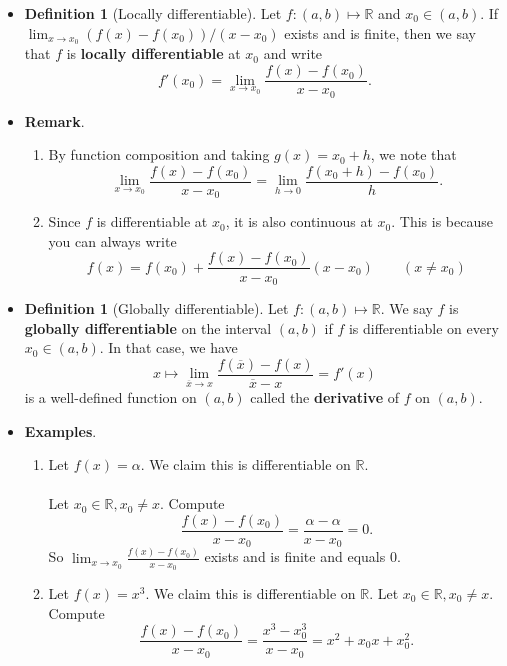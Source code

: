 \documentclass{article}
\newcommand{\R}{\mathbb{R}}
\newcommand{\?}{\stackrel{?}{=}}
\theoremstyle{definition} %
\newtheorem{definition}[theorem]{Definition} %
\begin{document}
\begin{itemize}
    \item[]
    \begin{definition}[Locally differentiable]
        Let $f: (a, b) \mapsto \R$ and $x_0 \in (a, b)$. If $\lim_{x \to x_0} (f(x) - f(x_0))/(x - x_0)$ exists and is finite, then we say that $f$ is \textbf{locally differentiable} at $x_0$ and write
        $$f'(x_0) = \lim_{x \to x_0} \frac{f(x) - f(x_0)}{x - x_0}.$$
    \end{definition}
    \item \textbf{Remark}.
    \begin{enumerate}[label=(\arabic*)]
        \item By function composition and taking $g(x) = x_0 + h$, we note that
        $$\lim_{x \to x_0} \frac{f(x) - f(x_0)}{x - x_0} = \lim_{h \to 0} \frac{f(x_0 + h) - f(x_0)}{h}.$$
        \item Since $f$ is differentiable at $x_0$, it is also continuous at $x_0$. This is because you can always write
        $$f(x) = f(x_0) + \frac{f(x) - f(x_0)}{x - x_0} (x - x_0) \qquad (x \neq x_0)$$
    \end{enumerate}
    \item[]
    \begin{definition}[Globally differentiable]
        Let $f: (a, b) \mapsto \R$. We say $f$ is \textbf{globally differentiable} on the interval $(a, b)$ if $f$ is differentiable on every $x_0 \in (a, b)$. In that case, we have
        $$x \mapsto \lim_{\overline{x} \to x} \frac{f(\overline{x}) - f(x)}{\overline{x} - x} = f'(x)$$
        is a well-defined function on $(a, b)$ called the \textbf{derivative} of $f$ on $(a, b)$.
    \end{definition}
    \item \textbf{Examples}.
    \begin{enumerate}[label=(\arabic*)]
        \item Let $f(x) = \alpha$. We claim this is differentiable on $\R$. \\\\
        Let $x_0 \in \R, x_0 \neq x$. Compute
        $$\frac{f(x) - f(x_0)}{x - x_0} = \frac{\alpha - \alpha}{x - x_0} = 0.$$
        So $\lim_{x \to x_0} \frac{f(x) - f(x_0)}{x - x_0}$ exists and is finite and equals 0.
        \item Let $f(x) = x^3$. We claim this is differentiable on $\R$. Let $x_0 \in \R, x_0 \neq x$. Compute
        $$\frac{f(x) - f(x_0)}{x - x_0} = \frac{x^3 - x_0^3}{x - x_0} = x^2 + x_0x + x_0^2.$$

\end{enumerate}
\end{itemize}
\end{document}
